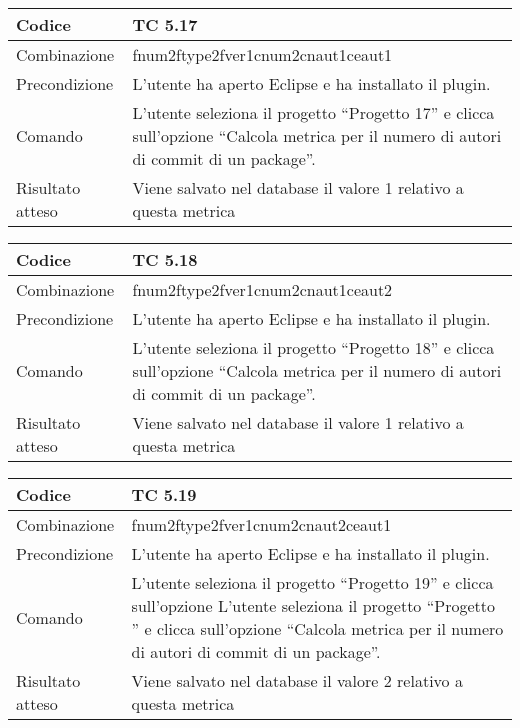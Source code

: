 \begin{table}[ht]
\begin{tabular}{|p{3cm}|p{9cm}|}
\hline
\cellcolor{lightgray}Codice				& TC 5.17								\\
\hline
\cellcolor{lightgray}Combinazione		& fnum2ftype2fver1cnum2cnaut1ceaut1							\\
\hline
\cellcolor{lightgray}Precondizione		& L'utente ha aperto Eclipse e ha installato il plugin.									\\
\hline
\cellcolor{lightgray}Comando			& L'utente seleziona il progetto ``Progetto 17''  e clicca sull'opzione ``Calcola metrica per il numero di autori di commit di un package''.	\\
\hline
\cellcolor{lightgray}Risultato atteso	& Viene salvato nel database il valore 1 relativo a questa metrica	\\
\hline
\end{tabular}
\end{table}

\begin{table}[ht]
\begin{tabular}{|p{3cm}|p{9cm}|}
\hline
\cellcolor{lightgray}Codice				& TC 5.18								\\
\hline
\cellcolor{lightgray}Combinazione		& fnum2ftype2fver1cnum2cnaut1ceaut2 									\\
\hline
\cellcolor{lightgray}Precondizione		& L'utente ha aperto Eclipse e ha installato il plugin.				\\
\hline
\cellcolor{lightgray}Comando			& L'utente seleziona il progetto ``Progetto 18''  e clicca sull'opzione ``Calcola metrica per il numero di autori di commit di un package''.	\\
\hline
\cellcolor{lightgray}Risultato atteso	& Viene salvato nel database il valore 1 relativo a questa metrica	\\
\hline
\end{tabular}
\end{table}

\clearpage

\begin{table}[ht]
\begin{tabular}{|p{3cm}|p{9cm}|}
\hline
\cellcolor{lightgray}Codice				& TC 5.19								\\
\hline
\cellcolor{lightgray}Combinazione		& fnum2ftype2fver1cnum2cnaut2ceaut1 									\\
\hline
\cellcolor{lightgray}Precondizione		& L'utente ha aperto Eclipse e ha installato il plugin.								\\
\hline
\cellcolor{lightgray}Comando			& L'utente seleziona il progetto ``Progetto 19''  e clicca sull'opzione L'utente seleziona il progetto ``Progetto ''  e clicca sull'opzione ``Calcola metrica per il numero di autori di commit di un package''.	\\
\hline
\cellcolor{lightgray}Risultato atteso	& Viene salvato nel database il valore 2 relativo a questa metrica	\\
\hline
\end{tabular}
\end{table}



